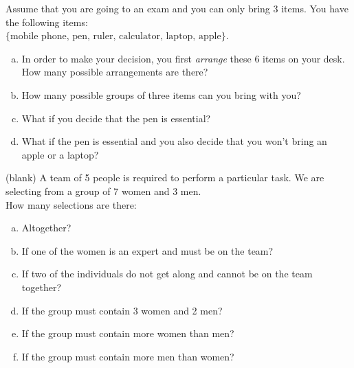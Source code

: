 \documentclass[a4paper,12pt]{article}
\begin{document}
Assume that you are going to an exam and you can only bring 3 items. You have the following items:\\ $\{\text{mobile phone, } \text{pen, } \text{ruler, } \text{calculator, } \text{laptop, } \text{apple} \}$.\\[-0.2cm]
\begin{enumerate}[(a)]
\item In order to make your decision, you first \emph{arrange} these 6 items on your desk. How many possible arrangements are there? \item How many possible groups of three items can you bring with you? \item What if you decide that the pen is essential? \item What if the pen is essential and you also decide that you won't bring an apple or a laptop?
\end{enumerate}
\newpage
(blank)
\newpage
A team of 5 people is required to perform a particular task. We are selecting from a group of 7 women and 3 men.\\[0.2cm]
How many selections are there:\\[-0.2cm]
\begin{enumerate}[(a)]
\item Altogether? \item If one of the women is an expert and must be on the team? \item If two of the individuals do not get along and cannot be on the team together? 
\item If the group must contain 3 women and 2 men? \item If the group must contain more women than men? \quad \item If the group must contain more men than women?
\end{enumerate}
\end{document}
